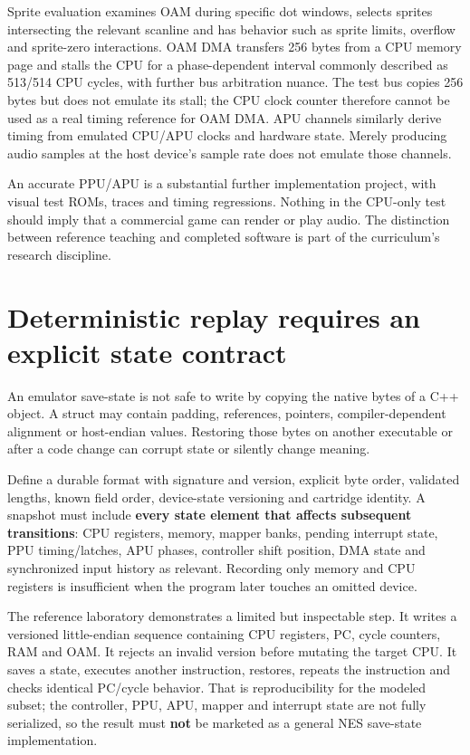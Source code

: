 Sprite evaluation examines OAM during specific dot windows, selects sprites intersecting the relevant scanline and has behavior such as sprite limits, overflow and sprite-zero interactions. OAM DMA transfers 256 bytes from a CPU memory page and stalls the CPU for a phase-dependent interval commonly described as 513/514 CPU cycles, with further bus arbitration nuance. The test bus copies 256 bytes but does not emulate its stall; the CPU clock counter therefore cannot be used as a real timing reference for OAM DMA. APU channels similarly derive timing from emulated CPU/APU clocks and hardware state. Merely producing audio samples at the host device's sample rate does not emulate those channels.

An accurate PPU/APU is a substantial further implementation project, with visual test ROMs, traces and timing regressions. Nothing in the CPU-only test should imply that a commercial game can render or play audio. The distinction between reference teaching and completed software is part of the curriculum's research discipline.

\section{Deterministic replay requires an explicit state contract}\label{01-foundations-i-ch016-deterministic-replay-requires-an-explicit-state-contract}

\hypertarget{01-foundations-i-ch016-deterministic-replay-requires-an-explicit-state-contract}{}

An emulator save-state is not safe to write by copying the native bytes of a C++ object. A struct may contain padding, references, pointers, compiler-dependent alignment or host-endian values. Restoring those bytes on another executable or after a code change can corrupt state or silently change meaning.

Define a durable format with signature and version, explicit byte order, validated lengths, known field order, device-state versioning and cartridge identity. A snapshot must include \textbf{every state element that affects subsequent transitions}: CPU registers, memory, mapper banks, pending interrupt state, PPU timing/latches, APU phases, controller shift position, DMA state and synchronized input history as relevant. Recording only memory and CPU registers is insufficient when the program later touches an omitted device.

The reference laboratory demonstrates a limited but inspectable step. It writes a versioned little-endian sequence containing CPU registers, PC, cycle counters, RAM and OAM. It rejects an invalid version before mutating the target CPU. It saves a state, executes another instruction, restores, repeats the instruction and checks identical PC/cycle behavior. That is reproducibility for the modeled subset; the controller, PPU, APU, mapper and interrupt state are not fully serialized, so the result must \textbf{not} be marketed as a general NES save-state implementation.

